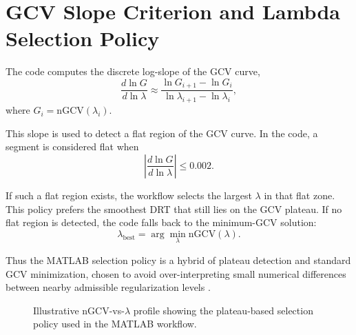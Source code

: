 \documentclass[11pt]{article}
\begin{document}
\section{GCV Slope Criterion and Lambda Selection Policy}

The code computes the discrete log-slope of the GCV curve,
\begin{equation}
\frac{d\ln G}{d\ln \lambda} \approx \frac{\ln G_{i+1} - \ln G_i}{\ln \lambda_{i+1} - \ln \lambda_i},
\end{equation}
where $G_i = \mathrm{nGCV}(\lambda_i)$.

This slope is used to detect a flat region of the GCV curve. In the code, a segment is considered flat when
\begin{equation}
\left|\frac{d\ln G}{d\ln \lambda}\right| \le 0.002.
\end{equation}

If such a flat region exists, the workflow selects the largest $\lambda$ in that flat zone. This policy prefers the smoothest DRT that still lies on the GCV plateau. If no flat region is detected, the code falls back to the minimum-GCV solution:
\begin{equation}
\lambda_{\mathrm{best}} = \arg\min_{\lambda} \mathrm{nGCV}(\lambda).
\end{equation}

Thus the MATLAB selection policy is a hybrid of plateau detection and standard GCV minimization, chosen to avoid over-interpreting small numerical differences between nearby admissible regularization levels \cite{schluter2019,maradesa2023,carbone2025}.

\begin{figure}[H]
\centering
{}
\caption{Illustrative nGCV-vs-$\lambda$ profile showing the plateau-based selection policy used in the MATLAB workflow.}
\end{figure}
\end{document}
